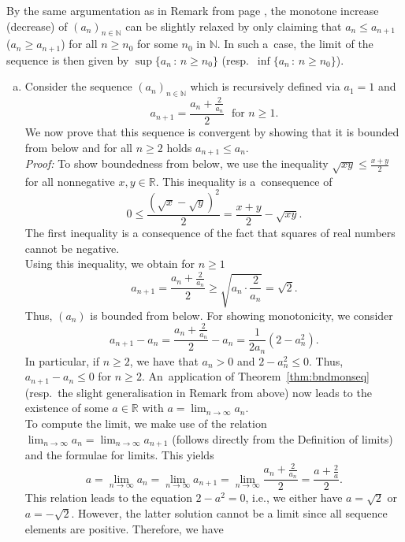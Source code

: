 \begin{Remark}{}\label{rem:monseqgen}
    By the same argumentation as in Remark from page \pageref{rem:n_0mon}, the monotone increase (decrease) of $(a_n)_{n\in\mathbb{N}}$ can be slightly relaxed by only claiming that $a_n\leq a_{n+1}$ ($a_n\geq a_{n+1}$) for all $n\geq n_0$ for some $n_0$ in $\mathbb{N}$. In such a~case, the limit of the sequence is then given by $\sup\{a_n\,:\,n\geq n_0\}$ (resp.\ $\inf\{a_n\,:\,n\geq n_0\}$).
\end{Remark}

\begin{example}{}\label{ex:monseqconv}
 \begin{enumerate}[a)]
  \item Consider the sequence $(a_n)_{n\in\mathbb{N}}$ which is recursively defined via $a_1=1$ and 
  \[a_{n+1}=\frac{a_n+\frac2{a_n}}{2}\;\text{  for $n\geq 1$.}\] 
  We now prove that this sequence is convergent by showing that
it is bounded from below and for all $n\geq2$ holds $a_{n+1}\leq a_n$.\\[2ex]
{\em Proof:} To show boundedness from below, we use the inequality $\sqrt{xy}\leq\frac{x+y}2$ for all nonnegative $x,y\in\mathbb{R}$. This inequality is a~consequence of
\[0\leq\frac{(\sqrt{x}-\sqrt{y})^2}2=\frac{x+y}2-\sqrt{xy}.\]
The first inequality is a consequence of the fact that squares of real numbers cannot be negative.\\
Using this inequality, we obtain for $n\geq1$
\[a_{n+1}=\frac{a_n+\frac{2}{a_n}}{2}\geq \sqrt{a_n\cdot\frac2{a_n}}=\sqrt{2}.\]
Thus, $(a_n)$ is bounded from below. For showing monotonicity, we consider
\[a_{n+1}-a_n=\frac{a_n+\frac2{a_n}}{2}-a_n=\frac{1}{2a_n}(2-a_n^2).\]
In particular, if $n\geq2$, we have that $a_n>0$ and $2-a_n^2\leq0$. Thus, $a_{n+1}-a_n\leq0$ for $n\geq2$. An~application of Theorem~\ref{thm:bndmonseq} (resp.\ the slight generalisation in Remark %
from above) 
now leads to the existence of some $a\in\mathbb{R}$ with $a=\lim_{n	\to\infty}a_n$.\\[2ex]
To compute the limit, we make use of the relation $\lim_{n \to\infty}a_n=\lim_{n\to\infty}a_{n+1}$ (follows directly from the Definition of limits) and the formulae for limits. This yields
\[a=\lim_{n \to\infty}a_n=\lim_{n\to\infty}a_{n+1}=\lim_{n\to\infty}\frac{a_n+\frac2{a_n}}{2}=\frac{a+\frac2{a}}{2}.\]
This relation leads to the equation $2-a^2=0$, i.e., we either have $a=\sqrt{2}$ or $a=-\sqrt{2}$. However, the latter solution cannot be a limit since all sequence elements are positive. Therefore, we have

\end{enumerate}
\end{example}
